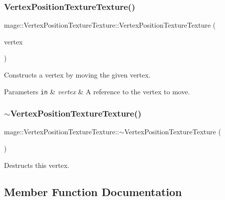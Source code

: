 \subsubsection{\texorpdfstring{Vertex\+Position\+Texture\+Texture()}{VertexPositionTextureTexture()}\hspace{0.1cm}{\footnotesize\ttfamily [4/4]}}
{\footnotesize\ttfamily mage\+::\+Vertex\+Position\+Texture\+Texture\+::\+Vertex\+Position\+Texture\+Texture (\begin{DoxyParamCaption}\item[{\hyperlink{structmage_1_1_vertex_position_texture_texture}{Vertex\+Position\+Texture\+Texture} \&\&}]{vertex }\end{DoxyParamCaption})\hspace{0.3cm}{\ttfamily [default]}}

Constructs a vertex by moving the given vertex.


\begin{DoxyParams}[1]{Parameters}
\mbox{\tt in}  & {\em vertex} & A reference to the vertex to move. \\
\hline
\end{DoxyParams}
\hypertarget{structmage_1_1_vertex_position_texture_texture_a861ed56f084a3385429eae5783178529}{}\label{structmage_1_1_vertex_position_texture_texture_a861ed56f084a3385429eae5783178529} 
\subsubsection{\texorpdfstring{$\sim$\+Vertex\+Position\+Texture\+Texture()}{~VertexPositionTextureTexture()}}
{\footnotesize\ttfamily mage\+::\+Vertex\+Position\+Texture\+Texture\+::$\sim$\+Vertex\+Position\+Texture\+Texture (\begin{DoxyParamCaption}{ }\end{DoxyParamCaption})\hspace{0.3cm}{\ttfamily [default]}}

Destructs this vertex. 

\subsection{Member Function Documentation}
\hypertarget{structmage_1_1_vertex_position_texture_texture_a7909db2966b9c3bab061a4bd22868019}{}\label{structmage_1_1_vertex_position_texture_texture_a7909db2966b9c3bab061a4bd22868019} 

